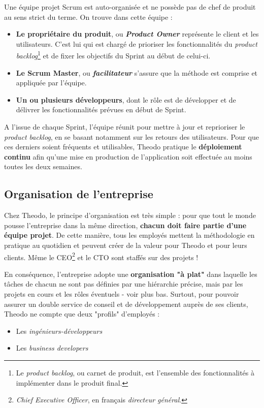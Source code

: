 Une équipe projet Scrum est auto-organisée et ne possède pas de chef de produit au sens strict du terme. On trouve dans cette équipe :
\begin{itemize}
\item \textbf{Le propriétaire du produit}, ou \textbf{\textit{Product Owner}} représente le client et les utilisateurs. C'est lui qui est chargé de prioriser les fonctionnalités du \textit{product backlog}\footnote{Le \textit{product backlog}, ou carnet de produit, est l'ensemble des fonctionnalités à implémenter dans le produit final.} et de fixer les objectifs du Sprint au début de celui-ci.
\item \textbf{Le Scrum Master}, ou \textbf{\textit{facilitateur}} s'assure que la méthode est comprise et appliquée par l'équipe.
\item \textbf{Un ou plusieurs développeurs}, dont le rôle est de développer et de délivrer les fonctionnalités prévues en début de Sprint.
\end{itemize}

A l'issue de chaque Sprint, l'équipe réunit pour mettre à jour et reprioriser le \textit{product backlog}, en se basant notamment sur les retours des utilisateurs. Pour que ces derniers soient fréquents et utilisables, Theodo pratique le \textbf{déploiement continu} afin qu'une mise en production de l'application soit effectuée au moins toutes les deux semaines.

\subsection{Organisation de l'entreprise}

Chez Theodo, le principe d'organisation est très simple : pour que tout le monde pousse l'entreprise dans la même direction, \textbf{chacun doit faire partie d'une équipe projet}. De cette manière, tous les employés mettent la méthodologie en pratique au quotidien et peuvent créer de la valeur pour Theodo et pour leurs clients. Même le CEO\footnote{\textit{\foreignlanguage{english}{Chief Executive Officer}}, en français \textit{directeur général}.} et le CTO sont staffés sur des projets !

En conséquence, l'entreprise adopte une \textbf{organisation "à plat"} dans laquelle les tâches de chacun ne sont pas définies par une hiérarchie précise, mais par les projets en cours et les rôles éventuels - voir plus bas. Surtout, pour pouvoir assurer un double service de conseil et de développement auprès de ses clients, Theodo ne compte que deux "profils" d'employés :
\begin{itemize}
\item Les \textit{ingénieurs-développeurs}
\item Les \textit{\foreignlanguage{english}{business developers}}
\end{itemize}

